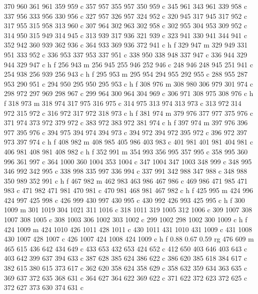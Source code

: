 {{   370 960 361 961 359 959 c
   357 957 355 957 350 959 c
   345 961 343 961 339 958 c
   337 956 333 956 330 956 c
   327 957 326 957 324 952 c
   320 945 317 945 317 952 c
   317 955 315 958 313 960 c
   307 964 302 963 302 958 c
   302 955 304 953 309 952 c
   314 950 315 949 314 945 c
   313 939 317 936 321 939 c
   323 941 330 941 344 941 c
   352 942 360 939 362 936 c
   364 933 369 936 372 941 c
   h f
   329 947 m
   329 949 331 951 333 952 c
   336 953 337 953 337 951 c
   338 950 338 948 337 947 c
   336 944 329 944 329 947 c
   h f
   256 943 m
   256 945 255 946 252 946 c
   248 946 248 945 251 941 c
   254 938 256 939 256 943 c
   h f
   295 953 m
   295 954 294 955 292 955 c
   288 955 287 953 290 951 c
   294 950 295 950 295 953 c
   h f
   308 976 m
   308 980 306 979 301 974 c
   298 972 297 969 298 967 c
   299 964 300 964 304 969 c
   306 971 308 975 308 976 c
   h f
   318 973 m
   318 974 317 975 316 975 c
   314 975 313 974 313 973 c
   313 972 314 972 315 972 c
   316 972 317 972 318 973 c
   h f
   381 974 m
   379 976 377 977 375 976 c
   371 974 373 972 379 972 c
   383 972 383 972 381 974 c
   h f
   397 974 m
   397 976 396 977 395 976 c
   394 975 394 974 394 973 c
   394 972 394 972 395 972 c
   396 972 397 973 397 974 c
   h f
   408 982 m
   408 985 405 986 403 983 c
   401 981 401 981 404 981 c
   406 981 408 981 408 982 c
   h f
   352 991 m
   354 993 356 995 357 995 c
   358 995 360 996 361 997 c
   364 1000 360 1004 353 1004 c
   347 1004 347 1003 348 999 c
   348 995 346 992 342 995 c
   338 998 335 997 336 994 c
   337 991 342 988 347 988 c
   348 988 350 989 352 991 c
   h f
   467 982 m
   462 983 463 986 467 986 c
   469 986 471 985 471 983 c
   471 982 471 981 470 981 c
   470 981 468 981 467 982 c
   h f
   425 995 m
   424 996 424 997 425 998 c
   426 999 430 997 430 995 c
   430 992 426 993 425 995 c
   h f
   300 1009 m
   301 1019 304 1021 311 1016 c
   318 1011 319 1005 312 1006 c
   309 1007 308 1007 308 1005 c
   308 1003 306 1002 303 1002 c
   299 1002 298 1002 300 1009 c
   h f
   424 1009 m
   424 1010 426 1011 428 1011 c
   430 1011 431 1010 431 1009 c
   431 1008 430 1007 428 1007 c
   426 1007 424 1008 424 1009 c
   h f
   0.88 0.67 0.59 rg
   476 609 m
   465 615 436 642 434 649 c
   433 653 432 653 424 652 c
   412 650 403 646 403 643 c
   403 642 399 637 394 633 c
   387 628 385 624 386 622 c
   386 620 385 618 384 617 c
   382 615 380 615 373 617 c
   362 620 358 624 358 629 c
   358 632 359 634 363 635 c
   369 637 372 635 368 631 c
   364 627 364 622 369 622 c
   371 622 372 623 372 625 c
   372 627 373 630 374 631 c
}}
